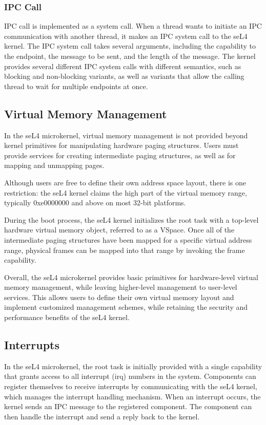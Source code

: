 \documentclass[
	a4paper, %
	11pt, %
	unnumberedsections, %
	twoside, %
]{LTJournalArticle}
\begin{document}
\subsubsection{IPC Call}
IPC call is implemented as a system call. When a thread wants to initiate an IPC communication with another thread, it makes an IPC system call to the seL4 kernel. The IPC system call takes several arguments, including the capability to the endpoint, the message to be sent, and the length of the message. The kernel provides several different IPC system calls with different semantics, such as blocking and non-blocking variants, as well as variants that allow the calling thread to wait for multiple endpoints at once.

\subsection{Virtual Memory Management}
In the seL4 microkernel, virtual memory management is not provided beyond kernel primitives for manipulating hardware paging structures. Users must provide services for creating intermediate paging structures, as well as for mapping and unmapping pages.

Although users are free to define their own address space layout, there is one restriction: the seL4 kernel claims the high part of the virtual memory range, typically 0xe0000000 and above on most 32-bit platforms.

During the boot process, the seL4 kernel initializes the root task with a top-level hardware virtual memory object, referred to as a VSpace. Once all of the intermediate paging structures have been mapped for a specific virtual address range, physical frames can be mapped into that range by invoking the frame capability.

Overall, the seL4 microkernel provides basic primitives for hardware-level virtual memory management, while leaving higher-level management to user-level services. This allows users to define their own virtual memory layout and implement customized management schemes, while retaining the security and performance benefits of the seL4 kernel.
\subsection{Interrupts}
In the seL4 microkernel, the root task is initially provided with a single capability that grants access to all interrupt (irq) numbers in the system. Components can register themselves to receive interrupts by communicating with the seL4 kernel, which manages the interrupt handling mechanism. When an interrupt occurs, the kernel sends an IPC message to the registered component. The component can then handle the interrupt and send a reply back to the kernel.
\end{document}
